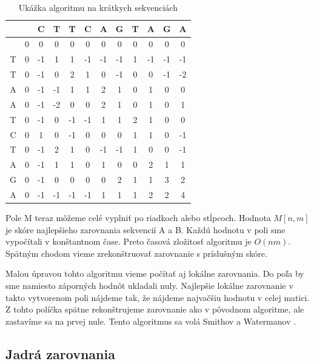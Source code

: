 \begin{table}
    \centering
    \begin{tabular}{ c || c | c | c | c | c | c | c | c | c | c | c }
            &   & C & T & T & C & A & G & T & A & G & A \\ \hline \hline
            & 0 & 0 & 0 & 0 & 0 & 0 & 0 & 0 & 0 & 0 & 0 \\ \hline 
        T   & 0 &-1 & 1 & 1 &-1 &-1 &-1 & 1 &-1 &-1 &-1 \\ \hline 
        T   & 0 &-1 & 0 & 2 & 1 & 0 &-1 & 0 & 0 &-1 &-2 \\ \hline 
        A   & 0 &-1 &-1 & 1 & 1 & 2 & 1 & 0 & 1 & 0 & 0 \\ \hline 
        A   & 0 &-1 &-2 & 0 & 0 & 2 & 1 & 0 & 1 & 0 & 1 \\ \hline 
        T   & 0 &-1 & 0 &-1 &-1 & 1 & 1 & 2 & 1 & 0 & 0 \\ \hline 
        C   & 0 & 1 & 0 &-1 & 0 & 0 & 0 & 1 & 1 & 0 &-1 \\ \hline 
        T   & 0 &-1 & 2 & 1 & 0 &-1 &-1 & 1 & 0 & 0 &-1 \\ \hline 
        A   & 0 &-1 & 1 & 1 & 0 & 1 & 0 & 0 & 2 & 1 & 1 \\ \hline 
        G   & 0 &-1 & 0 & 0 & 0 & 0 & 2 & 1 & 1 & 3 & 2 \\ \hline 
        A   & 0 &-1 &-1 &-1 &-1 & 1 & 1 & 1 & 2 & 2 & 4 \\
    \end{tabular}
    \caption{Ukážka algoritmu na krátkych sekvenciách}
\end{table}

Pole M teraz môžeme celé vyplniť po riadkoch alebo stĺpcoch. Hodnota $M[n, m]$ je skóre najlepšieho zarovnania sekvencií A a B. Každú hodnotu v poli sme vypočítali v konštantnom čase. Preto časová zložitosť algoritmu je $O(nm)$. Spätným chodom vieme zrekonštruovať zarovnanie s príslušným skóre.

Malou úpravou tohto algoritmu vieme počítať aj lokálne zarovnania. Do poľa by sme namiesto záporných hodnôt ukladali nuly. Najlepšie lokálne zarovnanie v takto vytvorenom poli nájdeme tak, že nájdeme najvačšiu hodnotu v celej matici. Z tohto políčka spätne rekonštrujeme zarovnanie ako v pôvodnom algoritme, ale zastavíme sa na prvej nule. Tento algoritmus sa volá Smithov a Watermanov \citep{smith1981identification}.

\subsection{Jadrá zarovnania}

